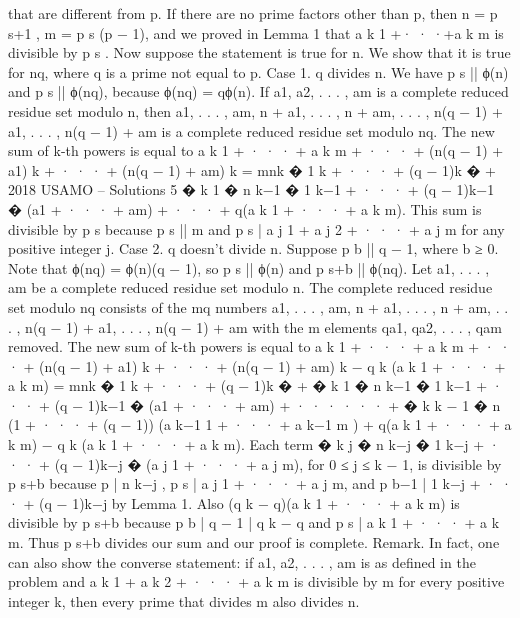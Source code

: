 \documentclass[12pt]{article}
\begin{document}
that are different from p. If there are no prime factors other than p, then n = p
s+1
, m = p
s
(p − 1),
and we proved in Lemma 1 that a
k
1 +· · ·+a
k
m is divisible by p
s
. Now suppose the statement is true
for n. We show that it is true for nq, where q is a prime not equal to p.
Case 1. q divides n. We have p
s
|| ϕ(n) and p
s
|| ϕ(nq), because ϕ(nq) = qϕ(n). If {a1, a2, . . . , am}
is a complete reduced residue set modulo n, then
{a1, . . . , am, n + a1, . . . , n + am, . . . , n(q − 1) + a1, . . . , n(q − 1) + am}
is a complete reduced residue set modulo nq. The new sum of k-th powers is equal to
a
k
1 + · · · + a
k
m + · · · + (n(q − 1) + a1)
k + · · · + (n(q − 1) + am)
k = mnk
�
1
k + · · · + (q − 1)k
�
+
2018 USAMO – Solutions 5
�
k
1
�
n
k−1
�
1
k−1 + · · · + (q − 1)k−1
�
(a1 + · · · + am) + · · · + q(a
k
1 + · · · + a
k
m).
This sum is divisible by p
s because p
s
|| m and p
s
| a
j
1 + a
j
2 + · · · + a
j
m for any positive integer j.
Case 2. q doesn’t divide n. Suppose p
b
|| q − 1, where b ≥ 0. Note that ϕ(nq) = ϕ(n)(q − 1), so
p
s
|| ϕ(n) and p
s+b
|| ϕ(nq). Let {a1, . . . , am} be a complete reduced residue set modulo n. The
complete reduced residue set modulo nq consists of the mq numbers
{a1, . . . , am, n + a1, . . . , n + am, . . . , n(q − 1) + a1, . . . , n(q − 1) + am}
with the m elements {qa1, qa2, . . . , qam} removed.
The new sum of k-th powers is equal to
a
k
1 + · · · + a
k
m + · · · + (n(q − 1) + a1)
k + · · · + (n(q − 1) + am)
k − q
k
(a
k
1 + · · · + a
k
m) =
mnk
�
1
k + · · · + (q − 1)k
�
+
�
k
1
�
n
k−1
�
1
k−1 + · · · + (q − 1)k−1
�
(a1 + · · · + am) + · · ·
· · · +
�
k
k − 1
�
n (1 + · · · + (q − 1)) (a
k−1
1 + · · · + a
k−1
m ) + q(a
k
1 + · · · + a
k
m) − q
k
(a
k
1 + · · · + a
k
m).
Each term
�
k
j
�
n
k−j
�
1
k−j + · · · + (q − 1)k−j
�
(a
j
1 + · · · + a
j
m),
for 0 ≤ j ≤ k − 1, is divisible by p
s+b because p | n
k−j
, p
s
| a
j
1 + · · · + a
j
m, and p
b−1
| 1
k−j + · · · +
(q − 1)k−j by Lemma 1.
Also (q
k − q)(a
k
1 + · · · + a
k
m) is divisible by p
s+b because p
b
| q − 1 | q
k − q and p
s
| a
k
1 + · · · + a
k
m.
Thus p
s+b divides our sum and our proof is complete.
Remark. In fact, one can also show the converse statement: if {a1, a2, . . . , am} is as defined in
the problem and a
k
1 + a
k
2 + · · · + a
k
m is divisible by m for every positive integer k, then every prime
that divides m also divides n.
\end{document}
